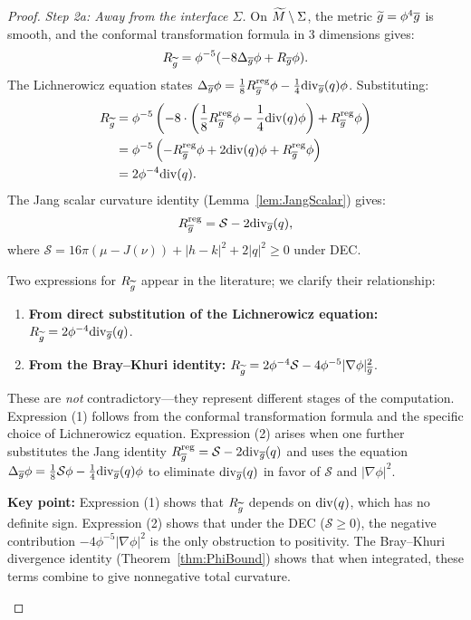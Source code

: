 \begin{proof}
\textit{Step 2a: Away from the interface $\Sigma$.}
On $\widetilde{M} \setminus \Sigma$, the metric $\widetilde{g} = \phi^4 \overline{g}$ is smooth, and the conformal transformation formula in 3 dimensions gives:
\begin{equation}
    R_{\widetilde{g}} = \phi^{-5}(-8\Delta_{\overline{g}}\phi + R_{\overline{g}}\phi).
\end{equation}
The Lichnerowicz equation states $\Delta_{\overline{g}}\phi = \frac{1}{8}R_{\overline{g}}^{\mathrm{reg}}\phi - \frac{1}{4}\mathrm{div}_{\overline{g}}(q)\phi$. Substituting:
\begin{align*}
    R_{\widetilde{g}} &= \phi^{-5}\left(-8 \cdot \left(\frac{1}{8}R_{\overline{g}}^{\mathrm{reg}}\phi - \frac{1}{4}\mathrm{div}(q)\phi\right) + R_{\overline{g}}^{\mathrm{reg}}\phi\right) \\
    &= \phi^{-5}\left(-R_{\overline{g}}^{\mathrm{reg}}\phi + 2\mathrm{div}(q)\phi + R_{\overline{g}}^{\mathrm{reg}}\phi\right) \\
    &= 2\phi^{-4}\mathrm{div}(q).
\end{align*}
The Jang scalar curvature identity (Lemma~\ref{lem:JangScalar}) gives:
\begin{equation}
    R_{\overline{g}}^{\mathrm{reg}} = \mathcal{S} - 2\mathrm{div}_{\overline{g}}(q),
\end{equation}
where $\mathcal{S} = 16\pi(\mu - J(\nu)) + |h-k|^2 + 2|q|^2 \ge 0$ under DEC.

\begin{remark}\label{rem:ScalarCurvatureReconciliation}
Two expressions for $R_{\widetilde{g}}$ appear in the literature; we clarify their relationship:
\begin{enumerate}
    \item \textbf{From direct substitution of the Lichnerowicz equation:} $R_{\widetilde{g}} = 2\phi^{-4}\mathrm{div}_{\overline{g}}(q)$.
    \item \textbf{From the Bray--Khuri identity:} $R_{\widetilde{g}} = 2\phi^{-4} \mathcal{S} - 4\phi^{-5}|\nabla\phi|^2_{\overline{g}}$.
\end{enumerate}
These are \emph{not} contradictory---they represent different stages of the computation. Expression (1) follows from the conformal transformation formula and the specific choice of Lichnerowicz equation. Expression (2) arises when one further substitutes the Jang identity $R_{\overline{g}}^{\mathrm{reg}} = \mathcal{S} - 2\mathrm{div}_{\overline{g}}(q)$ and uses the equation $\Delta_{\overline{g}}\phi = \frac{1}{8}\mathcal{S}\phi - \frac{1}{4}\mathrm{div}_{\overline{g}}(q)\phi$ to eliminate $\mathrm{div}_{\overline{g}}(q)$ in favor of $\mathcal{S}$ and $|\nabla\phi|^2$.

\textbf{Key point:} Expression (1) shows that $R_{\widetilde{g}}$ depends on $\mathrm{div}(q)$, which has no definite sign. Expression (2) shows that under the DEC ($\mathcal{S} \ge 0$), the negative contribution $-4\phi^{-5}|\nabla\phi|^2$ is the only obstruction to positivity. The Bray--Khuri divergence identity (Theorem~\ref{thm:PhiBound}) shows that when integrated, these terms combine to give nonnegative total curvature.
\end{remark}


\end{proof}
